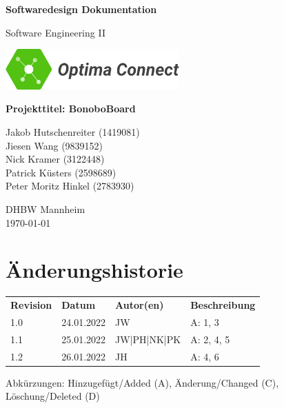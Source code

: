 \documentclass[a4paper,11pt]{scrartcl}
\begin{document}
\renewcommand*{\arraystretch}{1.2}
\begin{titlepage}
    \begin{center}
        \vspace*{1cm}\Huge
        \textbf{Softwaredesign Dokumentation}\par                
        \vspace{0.5cm}\LARGE        
        Software Engineering II\par           
        \vspace{2cm}
        \includegraphics[width=0.5\textwidth]{OptimaLogo_long}\par   
        \vspace{1cm}
        \textbf{Projekttitel: BonoboBoard}\par        
        \vfill\Large   
        Jakob Hutschenreiter (1419081)\\Jiesen Wang (9839152)\\Nick Kramer (3122448)\\Patrick Küsters (2598689)\\Peter Moritz Hinkel (2783930)\par
        \vspace{2cm}
        DHBW Mannheim\\
        \today     
    \end{center}
\end{titlepage}

\section*{Änderungshistorie}
\begin{table}[h]
	\begin{tabular}{@{} p{20mm} p{25mm} p{25mm} p{75mm}}
		\textbf{Revision} & \textbf{Datum} & \textbf{Autor(en)} & \textbf{Beschreibung}\\
		1.0 & 24.01.2022 & JW & A: 1, 3 \\ 
		1.1 & 25.01.2022 & JW|PH|NK|PK & A: 2, 4, 5  \\ 
        1.2 & 26.01.2022 & JH & A: 4, 6 \\ 
	\end{tabular}
\end{table}
\noindent
Abkürzungen: Hinzugefügt/Added (A), Änderung/Changed (C), Löschung/Deleted (D)
\vspace{2cm}
\tableofcontents
\newpage
{}
\end{document}
